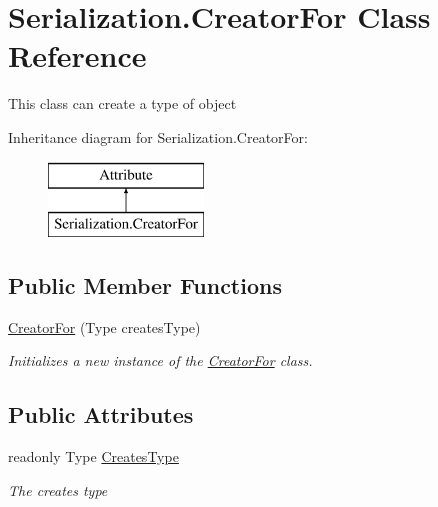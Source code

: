 \hypertarget{class_serialization_1_1_creator_for}{}\section{Serialization.\+Creator\+For Class Reference}
\label{class_serialization_1_1_creator_for}


This class can create a type of object  


Inheritance diagram for Serialization.\+Creator\+For\+:\begin{figure}[H]
\begin{center}
\leavevmode
\includegraphics[height=2.000000cm]{class_serialization_1_1_creator_for}
\end{center}
\end{figure}
\subsection*{Public Member Functions}
\begin{DoxyCompactItemize}
\item 
\hyperlink{class_serialization_1_1_creator_for_a4a5f1680ebe72dea8f522087ad4d2db3}{Creator\+For} (Type creates\+Type)
\begin{DoxyCompactList}\small\item\em Initializes a new instance of the \hyperlink{class_serialization_1_1_creator_for}{Creator\+For} class. \end{DoxyCompactList}\end{DoxyCompactItemize}
\subsection*{Public Attributes}
\begin{DoxyCompactItemize}
\item 
readonly Type \hyperlink{class_serialization_1_1_creator_for_a8c10d6db1b5eeb68cdce9ab14307142f}{Creates\+Type}
\begin{DoxyCompactList}\small\item\em The creates type \end{DoxyCompactList}\end{DoxyCompactItemize}


